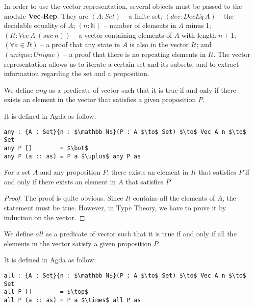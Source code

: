 \par In order to use the vector representation, several objects must
be passed to the module \textbf{Vec-Rep}. They are \((A : Set)\) -- a finite set;
\((dec : DecEq\ A)\) -- the decidable equality of \(A\); \((n : \mathbb
N)\) -- number of elements in \(A\) minus 1; \((It : Vec\ A\ (suc\ n))\) -- a
vector containing elements of \(A\) with length \(n + 1\); \((\forall
a\in It)\) -- a proof that any state in \(A\) is also in the vector
\(It\); and \((unique : Unique)\) -- a proof that there is no repeating
elements in \(It\). The vector representation allows us to iterate a
certain set and its subsets, and to extract information regarding the
set and a proposition. 

\begin{defn}
\noindent We define \(any\) as a predicate of vector such that it is
true if and only if there exists an element in the vector that satisfies a given
proposition \(P\). 
\end{defn}

\par It is defined in Agda as follow:
\begin{lstlisting}[mathescape=true,xleftmargin=.15\textwidth]
any : {A : Set}{n : $\mathbb N$}(P : A $\to$ Set) $\to$ Vec A n $\to$ Set
any P []        = $\bot$
any P (a :: as) = P a $\uplus$ any P as
\end{lstlisting} 

\begin{lem}
\noindent For a set \(A\) and any proposition \(P\), there exists an
element in \(It\) that satisfies \(P\) if and only if there exists an
element in \(A\) that satisfies \(P\). 
\end{lem}

\begin{proof}
\noindent The proof is quite obvious. Since \(It\) contains all the
elements of \(A\), the statement must be true. However, in Type
Theory, we have to prove it by induction on the vector.
\end{proof}

\begin{defn}
\noindent We define \(all\) as a predicate of vector such that it is
true if and only if all the elements in the vector satisfy a given
proposition \(P\). 
\end{defn}

\par It is defined in Agda as follow:
\begin{lstlisting}[mathescape=true,xleftmargin=.15\textwidth]
all : {A : Set}{n : $\mathbb N$}(P : A $\to$ Set) $\to$ Vec A n $\to$ Set
all P []        = $\top$
all P (a :: as) = P a $\times$ all P as
\end{lstlisting} 


